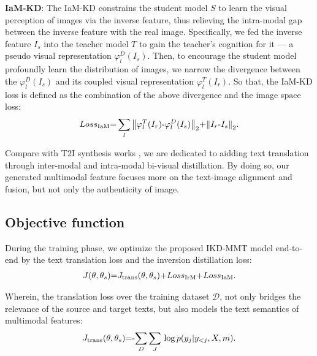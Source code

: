 \documentclass[11pt]{article}
\begin{document}
\textbf{IaM-KD}:
The IaM-KD constrains the student model $S$ to learn the visual perception of images via the inverse feature, thus relieving the intra-modal gap between the inverse feature with the real image.
Specifically, we fed the inverse feature ${I}_{s}$ into the teacher model $T$ to gain the teacher’s cognition for it --- a pseudo visual representation $\varphi _{l}^{D}\left( {{I}_{s}} \right)$.
Then, to encourage the student model profoundly learn the distribution of images, we narrow the divergence between the $\varphi _{l}^{D}\left( {{I}_{s}} \right)$ and its coupled visual representation $\varphi _{l}^{T}({{I}_{r}})$.
So that, the IaM-KD loss is defined as the combination of the above divergence and the image space loss:
\begin{gather}
Los{{s}_{\text{IaM}}}\text{=}\sum\limits_{l}{{{\left\| \varphi _{l}^{T}\text( {{I}_{r}} \text)\text{-}\varphi _{l}^{D}\text( {{I}_{s}} \text) \right\|}_{2}}}\text{+}{{\left\| {{I}_{r}}\text{-}{{I}_{s}} \right\|}_{2}}.\label{eq:8}
\end{gather}

Compare with T2I synthesis works \cite{reed2016generative,zhang2017stackgan,xu2018attngan}, we are dedicated to aidding text translation through inter-modal and intra-modal bi-visual distillation.
By doing so, our generated multimodal feature focuses more on the text-image alignment and fusion, but not only the authenticity of image.


\subsection{Objective function}
During the training phase, we optimize the proposed IKD-MMT model end-to-end by the text translation loss and the inversion distillation loss:
\begin{gather}
J\text( \theta ,{{\theta }_{s}} \text)\text{=}{{J}_{\text{trans}}}\text( \theta ,{{\theta }_{s}} \text)\text{+}Los{{s}_{\text{IrM}}}\text{+}Los{{s}_{\text{IaM}}}.\label{eq:9}
\end{gather}

Wherein, the translation loss over the training dataset $\mathcal{D}$, not only bridges the relevance of the source and target texts, but also models the text semantics of multimodal features:
\begin{gather}
{{J}_{\text{trans}}}\text( \theta ,{{\theta }_{s}} \text)\text{=-}\underset{D}{\mathop{\sum }}\,\underset{J}{\mathop{\sum }}\,\log p\text( {{y}_{j}}|{{{y}_{<j}}},X,m \text).\label{eq:10}
\end{gather}
\end{document}
